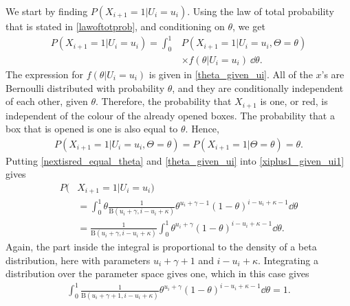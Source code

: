 We start by finding $P(X_{i+1}=1|U_i=u_i)$. Using the law of total probability that is stated in \eqref{lawoftotprob}, and conditioning on $\theta$, we get
\begin{equation}
\label{xiplus1_given_ui1}
    \begin{aligned}
        P(X_{i+1}=1|U_i=u_i)
        = \int_0^1 & P(X_{i+1}=1|U_i=u_i,\Theta=\theta)\\[6pt]
        &\times f(\theta|U_i=u_i)\: \dd \theta.
    \end{aligned}
\end{equation}
The expression for $f(\theta|U_i=u_i)$ is given in \eqref{theta_given_ui}. All of the $x$'s are Bernoulli distributed with probability $\theta$, and they are conditionally independent of each other, given $\theta$. Therefore, the probability that $X_{i+1}$ is one, or red, is independent of the colour of the already opened boxes. The probability that a box that is opened is one is also equal to $\theta$. Hence,
\begin{equation}
\label{nextisred_equal_theta}
    \begin{aligned}
        P(X_{i+1}=1|U_i=u_i,\Theta=\theta) = P(X_{i+1}=1|\Theta=\theta) = \theta.
    \end{aligned}
\end{equation}
Putting \eqref{nextisred_equal_theta} and \eqref{theta_given_ui} into \eqref{xiplus1_given_ui1} gives
\begin{equation}
\label{xiplus1_given_ui2}
    \begin{aligned}
        P(&X_{i+1}=1|U_i=u_i)\\
        &= \int_0^1 \theta \frac{1}{\text{B}(u_i+\gamma,i-u_i+\kappa)}\theta^{u_i+\gamma-1}(1-\theta)^{i-u_i+\kappa-1}  \dd \theta\\[6pt]
        &=\frac{1}{\text{B}(u_i+\gamma,i-u_i+\kappa)} \int_0^1 \theta^{u_i+\gamma}(1-\theta)^{i-u_i+\kappa-1} \dd \theta.
    \end{aligned}
\end{equation}
Again, the part inside the integral is proportional to the density of a beta distribution, here with parameters $u_i+\gamma+1$ and $i-u_i+\kappa$. Integrating a distribution over the parameter space gives one, which in this case gives
\begin{equation*}
    \begin{aligned}
        \int_0^1 \frac{1}{\text{B}(u_i+\gamma+1,i-u_i+\kappa)} \theta^{u_i+\gamma}(1-\theta)^{i-u_i+\kappa-1}  \dd \theta = 1.
    \end{aligned}
\end{equation*}
